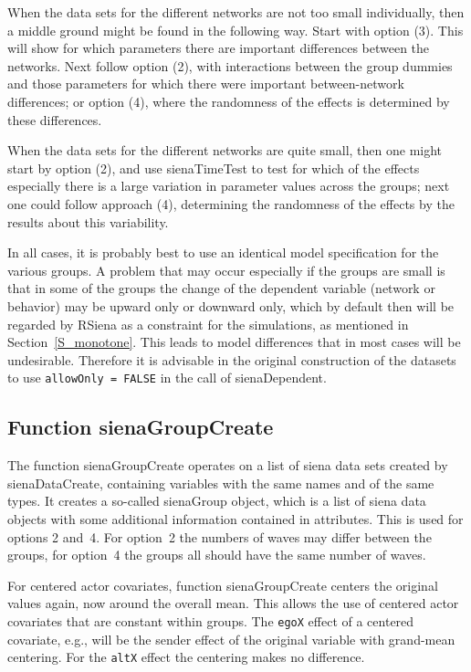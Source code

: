 \documentclass[a4paper,fleqn,11pt]{article}
\newcommand{\+}{\, + \,}
\newcommand{\sfn}[1]{\textsf{#1}}
\newcommand{\RS}{{\sf \textsf{RSiena} }}
\begin{document}
When the data sets for the different networks are not too small
individually,
then a middle ground might be found in the following way.
Start with option (3). This will show for which parameters there are
important differences between the networks.
Next follow option (2), with interactions between the group dummies
and those parameters for which there were important between-network
differences; or option (4), where the randomness of the effects
is determined by these differences.

When the data sets for the different networks are quite small,
then one might start by option (2), and use \textsf{sienaTimeTest} to test
for which of the effects especially there is a large variation in
parameter values across the groups;
next one could follow approach (4), determining the randomness of the effects
by the results about this variability.

In all cases, it is probably best to use an identical model specification
for the various groups. A problem that may occur especially if the groups
are small is that in some of the groups the change of the dependent variable
(network or behavior) may be upward only or downward only, which by default
then will be regarded by \RS as a constraint for the simulations,
as mentioned in Section~\ref{S_monotone}.
This leads to model differences that in most cases will be undesirable.
Therefore it is advisable in the original construction of the datasets
to use \texttt{allowOnly = FALSE} in the call of \textsf{sienaDependent}.

\subsection{Function \textsf{sienaGroupCreate}  }
\label{S_multigroup}

The function \textsf{sienaGroupCreate} operates on a list
of \sfn{siena} data sets created by \textsf{sienaDataCreate},
containing variables with the same names and of the same types.
It creates a so-called \sfn{sienaGroup} object, which is a list of
\sfn{siena} data objects with some additional information
contained in attributes.
This is used for options 2 and~4.
For option~2 the numbers of waves may differ between the groups,
for option~4 the groups all should have the same number of waves.

For centered actor covariates, function \textsf{sienaGroupCreate}
centers the original values again, now around the overall mean.
This allows the use of centered actor covariates that are
constant within groups.
The \texttt{egoX} effect of a centered covariate,
e.g., will be the sender effect of the original variable
with grand-mean centering. For the \texttt{altX} effect the centering
makes no difference.
\end{document}
